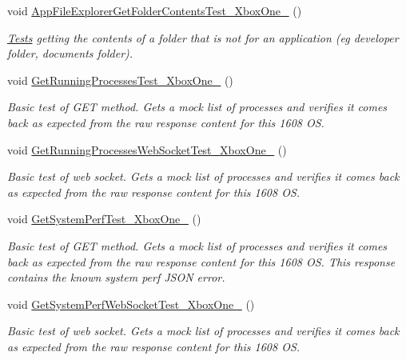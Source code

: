 \begin{DoxyCompactItemize}
void \hyperlink{class_microsoft_1_1_tools_1_1_windows_device_portal_1_1_tests_1_1_xbox_one__14385__1002__amd64frd9599e6105747a2dd5ce5cbe798a705b_a6ea05cdec94f0e3c3143158285f78a7b}{App\+File\+Explorer\+Get\+Folder\+Contents\+Test\+\_\+\+Xbox\+One\+\_} ()
\begin{DoxyCompactList}\small\item\em \hyperlink{namespace_microsoft_1_1_tools_1_1_windows_device_portal_1_1_tests}{Tests} getting the contents of a folder that is not for an application (eg developer folder, documents folder). \end{DoxyCompactList}\item 
void \hyperlink{class_microsoft_1_1_tools_1_1_windows_device_portal_1_1_tests_1_1_xbox_one__14385__1002__amd64frd9599e6105747a2dd5ce5cbe798a705b_a27892c6ab959c9c10c4aab994394d0c0}{Get\+Running\+Processes\+Test\+\_\+\+Xbox\+One\+\_} ()
\begin{DoxyCompactList}\small\item\em Basic test of G\+ET method. Gets a mock list of processes and verifies it comes back as expected from the raw response content for this 1608 OS. \end{DoxyCompactList}\item 
void \hyperlink{class_microsoft_1_1_tools_1_1_windows_device_portal_1_1_tests_1_1_xbox_one__14385__1002__amd64frd9599e6105747a2dd5ce5cbe798a705b_a93164fbb9ff83120e3649150f8d6b5a6}{Get\+Running\+Processes\+Web\+Socket\+Test\+\_\+\+Xbox\+One\+\_} ()
\begin{DoxyCompactList}\small\item\em Basic test of web socket. Gets a mock list of processes and verifies it comes back as expected from the raw response content for this 1608 OS. \end{DoxyCompactList}\item 
void \hyperlink{class_microsoft_1_1_tools_1_1_windows_device_portal_1_1_tests_1_1_xbox_one__14385__1002__amd64frd9599e6105747a2dd5ce5cbe798a705b_adc88aa7ba09aad1a08ed01c06302e891}{Get\+System\+Perf\+Test\+\_\+\+Xbox\+One\+\_} ()
\begin{DoxyCompactList}\small\item\em Basic test of G\+ET method. Gets a mock list of processes and verifies it comes back as expected from the raw response content for this 1608 OS. This response contains the known system perf J\+S\+ON error. \end{DoxyCompactList}\item 
void \hyperlink{class_microsoft_1_1_tools_1_1_windows_device_portal_1_1_tests_1_1_xbox_one__14385__1002__amd64frd9599e6105747a2dd5ce5cbe798a705b_a2e9e9d304794fb9bb6e108c2c657ba59}{Get\+System\+Perf\+Web\+Socket\+Test\+\_\+\+Xbox\+One\+\_} ()
\begin{DoxyCompactList}\small\item\em Basic test of web socket. Gets a mock list of processes and verifies it comes back as expected from the raw response content for this 1608 OS. \end{DoxyCompactList}\end{DoxyCompactItemize}
